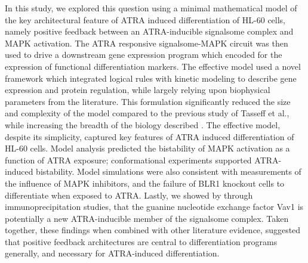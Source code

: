 \documentclass[12pt]{article}
\begin{document}
In this study, we explored this question using a minimal mathematical model of the key architectural feature of ATRA induced differentiation of HL-60 cells,
namely positive feedback between an ATRA-inducible signalsome complex and MAPK activation.
The ATRA responsive signalsome-MAPK circuit was then used to drive a downstream gene expression program which encoded for the expression of functional differentiation markers.
The effective model used a novel framework which integrated logical rules with kinetic modeling to describe gene expression and protein regulation,
while largely relying upon biophysical parameters from the literature.
This formulation significantly reduced the size and complexity of the model compared to the previous study of Tasseff et al., while increasing the breadth of the biology described \cite{Tasseff2011}.
The effective model, despite its simplicity, captured key features of ATRA induced differentiation of HL-60 cells.
Model analysis predicted the bistability of MAPK activation as a function of ATRA exposure; conformational experiments supported ATRA-induced bistability.
Model simulations were also consistent with measurements of the influence of MAPK inhibitors, and the failure of BLR1 knockout cells to differentiate when exposed to ATRA.
Lastly, we showed by through immunoprecipitation studies, that the guanine nucleotide exchange factor Vav1 is potentially a new ATRA-inducible member of the signalsome complex.
Taken together, these findings when combined with other literature evidence,
suggested that positive feedback architectures are central to differentiation programs generally, and necessary for ATRA-induced differentiation.


\clearpage
\end{document}
